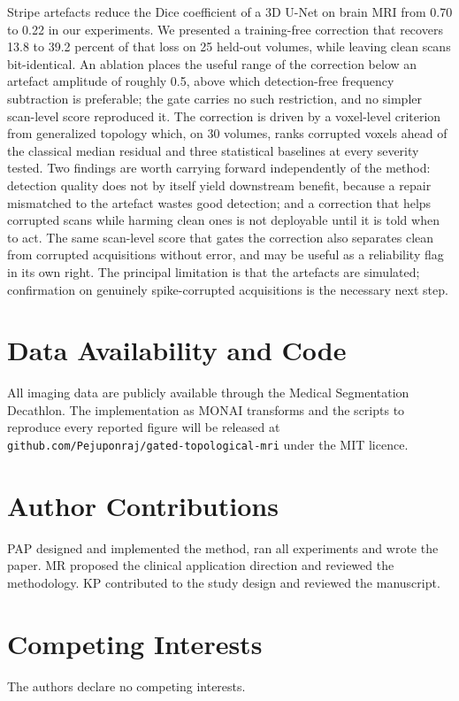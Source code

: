 \documentclass[12pt]{article}
\theoremstyle{definition}
\theoremstyle{plain}
\begin{document}
Stripe artefacts reduce the Dice coefficient of a 3D U-Net on brain MRI from 0.70 to
0.22 in our experiments. We presented a training-free correction that recovers 13.8
to 39.2 percent of that loss on 25 held-out volumes, while leaving clean scans
bit-identical. An ablation places the useful range of the correction below an
artefact amplitude of roughly 0.5, above which detection-free frequency subtraction
is preferable; the gate carries no such restriction, and no simpler scan-level score
reproduced it. The correction is driven by a voxel-level criterion from generalized
topology which, on 30 volumes, ranks corrupted voxels ahead of the classical median
residual and three statistical baselines at every severity tested. Two findings are
worth carrying forward independently of the method: detection quality does not by
itself yield downstream benefit, because a repair mismatched to the artefact wastes
good detection; and a correction that helps corrupted scans while harming clean ones
is not deployable until it is told when to act. The same scan-level score that gates
the correction also separates clean from corrupted acquisitions without error, and
may be useful as a reliability flag in its own right. The principal limitation is
that the artefacts are simulated; confirmation on genuinely spike-corrupted
acquisitions is the necessary next step.

\section*{Data Availability and Code}

All imaging data are publicly available through the Medical Segmentation Decathlon.
The implementation as MONAI transforms and the scripts to reproduce every reported
figure will be released at \texttt{github.com/Pejuponraj/gated-topological-mri} under the MIT licence.

\section*{Author Contributions}
PAP designed and implemented the method, ran all experiments and wrote the paper. MR proposed the clinical application direction and reviewed the methodology. KP contributed to the study design and reviewed the manuscript.

\section*{Competing Interests}
The authors declare no competing interests.
\end{document}
